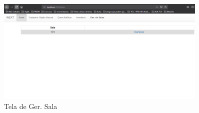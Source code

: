     \begin{figure}[H]
              \caption{\label{fig:tela_ger_sala}Tela de Ger. Sala}
              \centering
              \includegraphics[width=0.9\textwidth]{Figuras/tela_ger_sala.png}
    \end{figure}